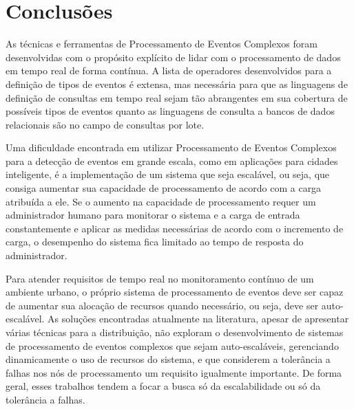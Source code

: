 \chapter{Conclusões}
\label{cap:conclusoes}



As técnicas e ferramentas de Processamento de Eventos Complexos foram desenvolvidas com o propósito explícito de lidar com o processamento de dados em tempo real de forma contínua. A lista de operadores desenvolvidos para a definição de tipos de eventos é extensa, mas necessária para que as linguagens de definição de consultas em tempo real sejam tão abrangentes em sua cobertura de possíveis tipos de eventos quanto as linguagens de consulta a bancos de dados relacionais são no campo de consultas por lote.

Uma dificuldade encontrada em utilizar Processamento de Eventos Complexos para a detecção de eventos em grande escala, como em aplicações para cidades inteligente, é a implementação de um sistema que seja escalável, ou seja, que consiga aumentar sua capacidade de processamento de acordo com a carga atribuída a ele. Se o aumento na capacidade de processamento requer um administrador humano para monitorar o sistema e a carga de entrada constantemente e aplicar as medidas necessárias de acordo com o incremento de carga, o desempenho do sistema fica limitado ao tempo de resposta do administrador. 

Para atender requisitos de tempo real no monitoramento contínuo de um ambiente urbano, o próprio sistema de processamento de eventos deve ser capaz de aumentar sua alocação de recursos quando necessário, ou seja, deve ser auto-escalável. As soluções encontradas atualmente na literatura, apesar de apresentar várias técnicas para a distribuição, não exploram o desenvolvimento de sistemas de processamento de eventos complexos que sejam auto-escaláveis, gerenciando dinamicamente o uso de recursos do sistema, e que considerem a tolerância a falhas nos nós de processamento um requisito igualmente importante. De forma  geral, esses trabalhos  tendem a focar a busca só da escalabilidade ou só da tolerância a falhas.


